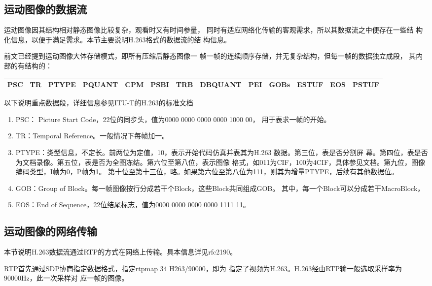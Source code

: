 \documentclass[11pt]{article}
\begin{document}
\subsection{运动图像的数据流}
    运动图像因其结构相对静态图像比较复杂，观看时又有时间参量，
同时有适应网络化传输的客观需求，所以其数据流之中便存在一些结
构化信息，以便于满足需求。本节主要说明H.263格式的数据流的结
构信息。
  
    前文已经提到运动图像大体存储模式，即所有压缩后静态图像一
帧一帧的连续顺序存储，并无复杂结构，但每一帧的数据独立成段，
其内部的有结构的：

\begin{table}[htbp]
{ \small
\begin{tabular}{|l|l|l|l|l|l|l|l|l|l|l|l|l|}
\hline PSC&TR&PTYPE&PQUANT&CPM&PSBI&TRB&DBQUANT&PEI&GOBs&ESTUF&EOS&PSTUF \\ 
\hline
\end{tabular}
}
\end{table}
以下说明重点数据段，详细信息参见ITU-T的H.263的标准文档
\begin{enumerate}
    \item PSC： Picture Start Code，22位的同步头，值为0000 0000 0000 0000 1000 00，
        用于表求一帧的开始。
    \item TR：Temporal Reference。一般情况下每帧加一。
    \item PTYPE：类型信息，不定长。前两位为定值，10，表示开始代码仿真并表其为H.263
    数据。第三位，表是否分割屏
    幕。第四位，表是否为文档录像。第五位，表是否为全图冻结。第六位至第八位，表示图像
    格式，如011为CIF，100为4CIF，具体参见文档。第九位，图像编码类型，I帧为0，P帧为1。
    第十位至第十三位，略。如果第六位至第八位为111，则其为增量PTYPE，后续有其他数据位。
    \item GOB：Group of Block。每一帧图像按行分成若干个Block，这些Block共同组成GOB。
        其中，每一个Block可以分成若干MacroBlock，
    \item EOS：End of Sequence，22位结尾标志，值为0000 0000 0000 0000 1111 11。
\end{enumerate}


\subsection{运动图像的网络传输}
    本节说明H.263数据流通过RTP的方式在网络上传输。具本信息详见rfc2190。

    RTP首先通过SDP协商指定数据格式，指定rtpmap 34 H263/90000，即为
指定了视频为H.263。H.263经由RTP输一般选取采样率为90000Hz，此一次采样对
应一帧的图像。
\end{document}
